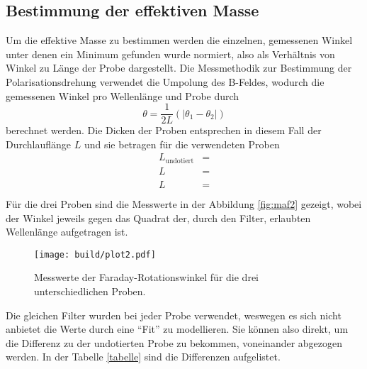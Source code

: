 \subsection{Bestimmung der effektiven Masse}
Um die effektive Masse zu bestimmen werden die einzelnen, gemessenen Winkel unter denen ein Minimum gefunden wurde
normiert, also als Verhältnis von Winkel zu Länge der Probe dargestellt. 
Die Messmethodik zur Bestimmung der Polarisationsdrehung verwendet die Umpolung des B-Feldes, wodurch die gemessenen Winkel pro Wellenlänge und Probe durch 
\begin{equation}
\theta = \frac{1}{2L} (|\theta_1 - \theta_2|)
\end{equation}
berechnet werden. Die Dicken der Proben entsprechen in diesem Fall der Durchlauflänge $L$ und sie betragen für die verwendeten Proben
\begin{align}
L_{\text{undotiert}} &= \\
L_{} &=\\
L_{} &=\\
\end{align}
Für die drei Proben sind die Messwerte in der Abbildung \ref{fig:maf2} gezeigt, wobei der Winkel 
jeweils gegen das Quadrat der, durch den Filter, erlaubten Wellenlänge aufgetragen ist.
\begin{figure}
    \centering
    \texttt{[image: build/plot2.pdf]}
    \caption{Messwerte der Faraday-Rotationswinkel für die drei unterschiedlichen Proben. }
    \label{maf2}
\end{figure}

Die gleichen Filter wurden bei jeder Probe verwendet, weswegen es sich nicht anbietet die Werte durch eine \enquote{Fit} zu modellieren.
Sie können also direkt, um die Differenz zu der undotierten Probe zu bekommen, voneinander abgezogen werden.
In der Tabelle \ref{tabelle} sind die Differenzen aufgelistet.